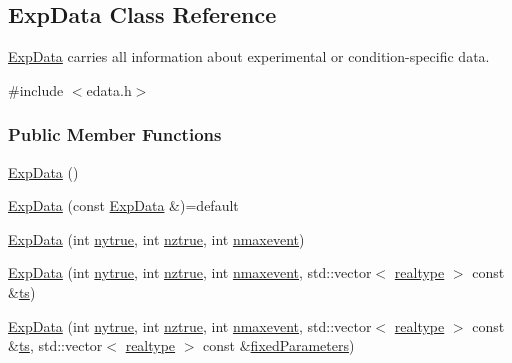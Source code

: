 \hypertarget{classamici_1_1_exp_data}{}\subsection{Exp\+Data Class Reference}
\label{classamici_1_1_exp_data}


\mbox{\hyperlink{classamici_1_1_exp_data}{Exp\+Data}} carries all information about experimental or condition-\/specific data.  




{\ttfamily \#include $<$edata.\+h$>$}

\subsubsection*{Public Member Functions}
\begin{DoxyCompactItemize}
\item 
\mbox{\hyperlink{classamici_1_1_exp_data_a19c9736cc55da621d8de182a76cc1e8f}{Exp\+Data}} ()
\item 
\mbox{\hyperlink{classamici_1_1_exp_data_a74a4a08956d260ee4a1b8f701564496d}{Exp\+Data}} (const \mbox{\hyperlink{classamici_1_1_exp_data}{Exp\+Data}} \&)=default
\item 
\mbox{\hyperlink{classamici_1_1_exp_data_af2322d528ad31a4335b0e5178b373649}{Exp\+Data}} (int \mbox{\hyperlink{classamici_1_1_exp_data_ac2657ffc58ee1ea80d6c4db40010e942}{nytrue}}, int \mbox{\hyperlink{classamici_1_1_exp_data_a9e9b6341842d8860b0114faa4e0c97ee}{nztrue}}, int \mbox{\hyperlink{classamici_1_1_exp_data_ae6996d31ed94180a4b1d79412eb5ce31}{nmaxevent}})
\item 
\mbox{\hyperlink{classamici_1_1_exp_data_a25832fe613894e3ab4e9c438936c4286}{Exp\+Data}} (int \mbox{\hyperlink{classamici_1_1_exp_data_ac2657ffc58ee1ea80d6c4db40010e942}{nytrue}}, int \mbox{\hyperlink{classamici_1_1_exp_data_a9e9b6341842d8860b0114faa4e0c97ee}{nztrue}}, int \mbox{\hyperlink{classamici_1_1_exp_data_ae6996d31ed94180a4b1d79412eb5ce31}{nmaxevent}}, std\+::vector$<$ \mbox{\hyperlink{namespaceamici_a1bdce28051d6a53868f7ccbf5f2c14a3}{realtype}} $>$ const \&\mbox{\hyperlink{classamici_1_1_exp_data_aa7014a80e7b102f85a10e3b9a480e8e5}{ts}})
\item 
\mbox{\hyperlink{classamici_1_1_exp_data_a4dc836c2db72abcd32318fc6654fc131}{Exp\+Data}} (int \mbox{\hyperlink{classamici_1_1_exp_data_ac2657ffc58ee1ea80d6c4db40010e942}{nytrue}}, int \mbox{\hyperlink{classamici_1_1_exp_data_a9e9b6341842d8860b0114faa4e0c97ee}{nztrue}}, int \mbox{\hyperlink{classamici_1_1_exp_data_ae6996d31ed94180a4b1d79412eb5ce31}{nmaxevent}}, std\+::vector$<$ \mbox{\hyperlink{namespaceamici_a1bdce28051d6a53868f7ccbf5f2c14a3}{realtype}} $>$ const \&\mbox{\hyperlink{classamici_1_1_exp_data_aa7014a80e7b102f85a10e3b9a480e8e5}{ts}}, std\+::vector$<$ \mbox{\hyperlink{namespaceamici_a1bdce28051d6a53868f7ccbf5f2c14a3}{realtype}} $>$ const \&\mbox{\hyperlink{classamici_1_1_exp_data_ac1d5115134ec1c839f1e913724ceb2b4}{fixed\+Parameters}})

\end{DoxyCompactItemize}
